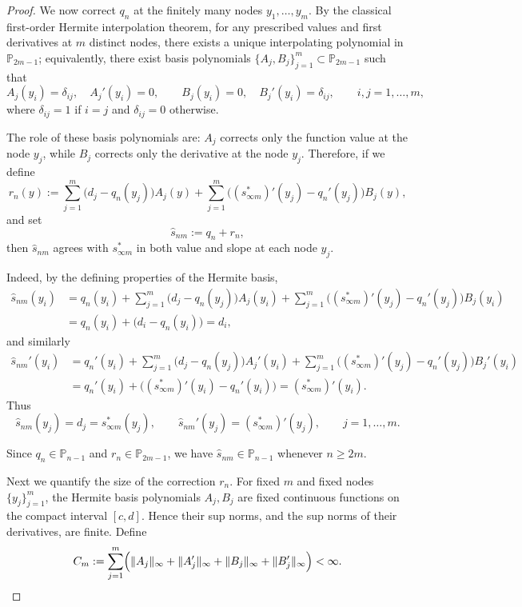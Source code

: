 \documentclass[12pt,leqno]{amsart}
\begin{document}
\begin{proof}
We now correct $q_n$ at the finitely many nodes
$y_1,\dots,y_m$. By the classical first-order Hermite interpolation
theorem, for any prescribed values and first derivatives at $m$
distinct nodes, there exists a unique interpolating polynomial in
$\mathbb P_{2m-1}$; equivalently, there exist basis polynomials
$\{A_j,B_j\}_{j=1}^m\subset \mathbb P_{2m-1}$ such that ~\cite[Section 8.2]{hildebrand1987introduction}
\[
A_j(y_i)=\delta_{ij},\quad A_j'(y_i)=0,
\qquad
B_j(y_i)=0,\quad B_j'(y_i)=\delta_{ij},
\qquad i,j=1,\dots,m,
\]
where $\delta_{ij}=1$ if $i=j$ and $\delta_{ij}=0$ otherwise. 

The role of these basis polynomials are: $A_j$ corrects only the
function value at the node $y_j$, while $B_j$ corrects only the
derivative at the node $y_j$. Therefore, if we define
\[
r_n(y)
:=
\sum_{j=1}^m\bigl(d_j-q_n(y_j)\bigr)A_j(y)
+
\sum_{j=1}^m\bigl((s_{\infty m}^*)'(y_j)-q_n'(y_j)\bigr)B_j(y),
\]
and set
\[
\hat s_{nm}:=q_n+r_n,
\]
then $\hat s_{nm}$ agrees with $s_{\infty m}^*$ in both value and
slope at each node $y_j$.

Indeed, by the defining properties of the Hermite basis,
\begin{align*}
\hat s_{nm}(y_i)
&=
q_n(y_i)
+\sum_{j=1}^m\bigl(d_j-q_n(y_j)\bigr)A_j(y_i)
+\sum_{j=1}^m\bigl((s_{\infty m}^*)'(y_j)-q_n'(y_j)\bigr)B_j(y_i)\\
&=
q_n(y_i)+\bigl(d_i-q_n(y_i)\bigr)=d_i,
\end{align*}
and similarly
\begin{align*}
\hat s_{nm}'(y_i)
&=
q_n'(y_i)
+\sum_{j=1}^m\bigl(d_j-q_n(y_j)\bigr)A_j'(y_i)
+\sum_{j=1}^m\bigl((s_{\infty m}^*)'(y_j)-q_n'(y_j)\bigr)B_j'(y_i)\\
&=
q_n'(y_i)+\bigl((s_{\infty m}^*)'(y_i)-q_n'(y_i)\bigr)
=(s_{\infty m}^*)'(y_i).
\end{align*}
Thus
\begin{equation}\label{eq:hermite-match-poly-proof}
\hat s_{nm}(y_j)=d_j=s_{\infty m}^*(y_j),
\qquad
\hat s_{nm}'(y_j)=(s_{\infty m}^*)'(y_j),
\qquad j=1,\dots,m.
\end{equation}

Since $q_n\in\mathbb P_{n-1}$ and $r_n\in\mathbb P_{2m-1}$, we have
$\hat s_{nm}\in\mathbb P_{n-1}$ whenever $n\ge 2m$.

Next we quantify the size of the correction $r_n$. For fixed $m$ and
fixed nodes $\{y_j\}_{j=1}^m$, the Hermite basis polynomials
$A_j,B_j$ are fixed continuous functions on the compact interval
$[c,d]$. Hence their sup norms, and the sup norms of their
derivatives, are finite. Define
\begin{equation}\label{eq:C_m}
C_m
:=
\sum_{j=1}^m
\Bigl(
\|A_j\|_\infty+\|A_j'\|_\infty+\|B_j\|_\infty+\|B_j'\|_\infty
\Bigr)
<\infty.    
\end{equation}


\end{proof}
\end{document}
